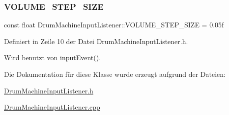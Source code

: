 \subsubsection{\texorpdfstring{V\+O\+L\+U\+M\+E\+\_\+\+S\+T\+E\+P\+\_\+\+S\+I\+ZE}{VOLUME\_STEP\_SIZE}}
{\footnotesize\ttfamily const float Drum\+Machine\+Input\+Listener\+::\+V\+O\+L\+U\+M\+E\+\_\+\+S\+T\+E\+P\+\_\+\+S\+I\+ZE = 0.\+05f\hspace{0.3cm}{\ttfamily [private]}}



Definiert in Zeile 10 der Datei Drum\+Machine\+Input\+Listener.\+h.



Wird benutzt von input\+Event().



Die Dokumentation für diese Klasse wurde erzeugt aufgrund der Dateien\+:\begin{DoxyCompactItemize}
\item 
\hyperlink{_drum_machine_input_listener_8h}{Drum\+Machine\+Input\+Listener.\+h}\item 
\hyperlink{_drum_machine_input_listener_8cpp}{Drum\+Machine\+Input\+Listener.\+cpp}\end{DoxyCompactItemize}
